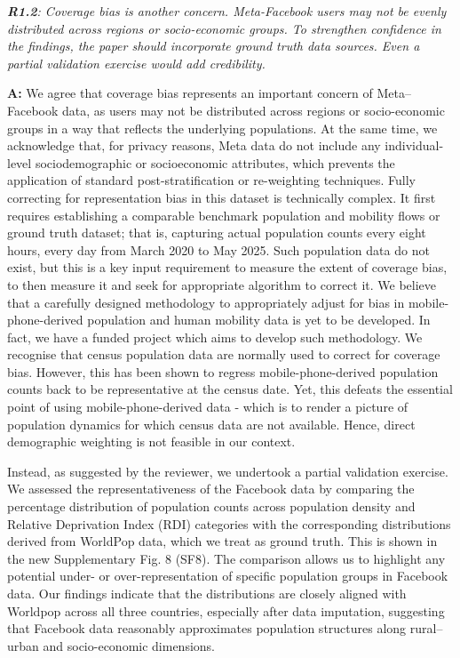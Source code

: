\documentclass[12pt,a4paper,oneside, reqno]{amsart}
\begin{document}
\setlength{\leftskip}{0cm} \textit{\textbf{R1.2}: Coverage bias is another concern. Meta-Facebook users may not be evenly distributed across regions or socio-economic groups. To strengthen confidence in the findings, the paper should incorporate ground truth data sources. Even a partial validation exercise would add credibility.}

\setlength{\leftskip}{1cm}\textbf{A:} We agree that coverage bias represents an important concern of Meta–Facebook data, as users may not be distributed across regions or socio-economic groups in a way that reflects the underlying populations. At the same time, we acknowledge that, for privacy reasons, Meta data do not include any individual-level sociodemographic or socioeconomic attributes, which prevents the application of standard post-stratification or re-weighting techniques. Fully correcting for representation bias in this dataset is technically complex. It first requires establishing a comparable benchmark population and mobility flows or ground truth dataset; that is, capturing actual population counts every eight hours, every day from March 2020 to May 2025. Such population data do not exist, but this is a key input requirement to measure the extent of coverage bias, to then measure it and seek for appropriate algorithm to correct it. We believe that a carefully designed methodology to appropriately adjust for bias in mobile-phone-derived population and human mobility data is yet to be developed. In fact, we have a funded project which aims to develop such methodology. We recognise that census population data are normally used to correct for coverage bias. However, this has been shown to regress mobile-phone-derived population counts back to be representative at the census date. Yet, this defeats the essential point of using mobile-phone-derived data - which is to render a picture of population dynamics for which census data are not available. Hence, direct demographic weighting is not feasible in our context. 

Instead, as suggested by the reviewer, we undertook a partial validation exercise. We assessed the representativeness of the Facebook data by comparing the percentage distribution of population counts across population density and Relative Deprivation Index (RDI) categories with the corresponding distributions derived from WorldPop data, which we treat as ground truth. This is shown in the new Supplementary Fig. 8 (SF8). The comparison allows us to highlight any potential under- or over-representation of specific population groups in Facebook data. Our findings indicate that the distributions are closely aligned with Worldpop across all three countries, especially after data imputation, suggesting that Facebook data reasonably approximates population structures along rural–urban and socio-economic dimensions.
\end{document}

